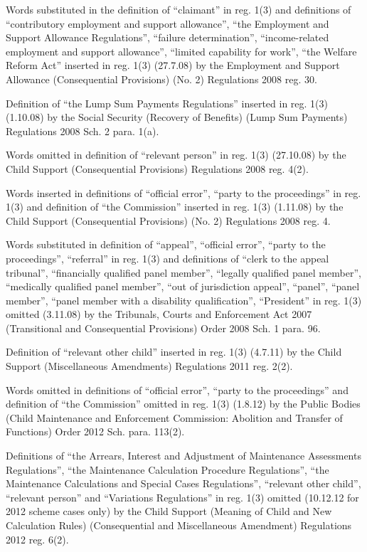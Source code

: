 \documentclass[12pt,a4paper]{article}
\begin{document}
{Words substituted in the definition of ``claimant'' in reg. 1(3) and definitions of ``contributory employment and support allowance'', ``the Employment and Support Allowance Regulations'', ``failure determination'', ``income-related employment and support allowance'', ``limited capability for work'', ``the Welfare Reform Act'' inserted in reg. 1(3) (27.7.08) by the Employment and Support Allowance (Consequential Provisions) (No. 2) Regulations 2008 reg. 30.

Definition of ``the Lump Sum Payments Regulations'' inserted in reg. 1(3) (1.10.08) by the Social Security (Recovery of Benefits) (Lump Sum Payments) Regulations 2008 Sch. 2 para. 1(a).

Words omitted in definition of ``relevant person'' in reg. 1(3) (27.10.08) by the Child Support (Consequential Provisions) Regulations 2008 reg. 4(2).

Words inserted in definitions of ``official error'', ``party to the proceedings'' in reg. 1(3) and definition of ``the Commission'' inserted in reg. 1(3) (1.11.08) by the Child Support (Consequential Provisions) (No. 2) Regulations 2008 reg. 4.

Words substituted in definition of ``appeal'', ``official error'', ``party to the proceedings'', ``referral'' in reg. 1(3) and definitions of ``clerk to the appeal tribunal'', ``financially qualified panel member'', ``legally qualified panel member'', ``medically qualified panel member'', ``out of jurisdiction appeal'', ``panel'', ``panel member'', ``panel member with a disability qualification'', ``President'' in reg. 1(3) omitted (3.11.08) by the Tribunals, Courts and Enforcement Act 2007 (Transitional and Consequential Provisions) Order 2008 Sch. 1 para. 96.

Definition of ``relevant other child'' inserted in reg. 1(3) (4.7.11) by the Child Support (Miscellaneous Amendments) Regulations 2011 reg. 2(2).

Words omitted in definitions of ``official error'', ``party to the proceedings'' and definition of ``the Commission'' omitted in reg. 1(3) (1.8.12) by the Public Bodies (Child Maintenance and Enforcement Commission: Abolition and Transfer of Functions) Order 2012 Sch. para. 113(2).

Definitions of ``the Arrears, Interest and Adjustment of Maintenance Assessments Regulations'', ``the Maintenance Calculation Procedure Regulations'', ``the Maintenance Calculations and Special Cases Regulations'', ``relevant other child'', ``relevant person'' and ``Variations Regulations'' in reg. 1(3) omitted (10.12.12 for 2012 scheme cases only) by the Child Support (Meaning of Child and New Calculation Rules) (Consequential and Miscellaneous Amendment) Regulations 2012 reg. 6(2).
}
\end{document}
